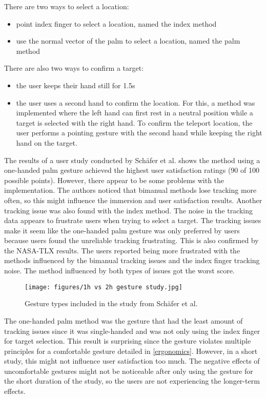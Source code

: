 There are two ways to select a location:
\begin{itemize}
  \item point index finger to select a location, named the index method
  \item use the normal vector of the palm to select a location, named the palm method
\end{itemize}

There are also two ways to confirm a target:
\begin{itemize}
  \item the user keeps their hand still for 1.5s
  \item the user uses a second hand to confirm the location. For this, a method was implemented where the left hand can first rest in a neutral position while a target is selected with the right hand. To confirm the teleport location, the user performs a pointing gesture with the second hand while keeping the right hand on the target.
\end{itemize}

The results of a user study conducted by Schäfer et al. \cite{Schafer2021} shows the method using a one-handed palm gesture achieved the highest user satisfaction ratings (90 of 100 possible points). However, there appear to be some problems with the implementation. The authors noticed that bimanual methods lose tracking more often, so this might influence the immersion and user satisfaction results. Another tracking issue was also found with the index method. The noise in the tracking data appears to frustrate users when trying to select a target. The tracking issues make it seem like the one-handed palm gesture was only preferred by users because users found the unreliable tracking frustrating. This is also confirmed by the NASA-TLX results. The users reported being more frustrated with the methods influenced by the bimanual tracking issues and the index finger tracking noise. The method influenced by both types of issues got the worst score. 

\begin{figure}[hbt!]
  \centering
  \texttt{[image: figures/1h vs 2h gesture study.jpg]}
  \caption{Gesture types included in the study from Schäfer et al. \cite{Schafer2021}}
  \label{fig:1vs2}
\end{figure}

The one-handed palm method was the gesture that had the least amount of tracking issues since it was single-handed and was not only using the index finger for target selection. This result is surprising since the gesture violates multiple principles for a comfortable gesture detailed in \ref{ergonomics}. However, in a short study, this might not influence user satisfaction too much. The negative effects of uncomfortable gestures might not be noticeable after only using the gesture for the short duration of the study, so the users are not experiencing the longer-term effects. 


